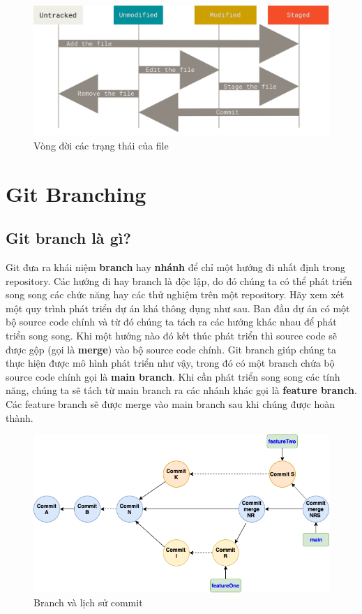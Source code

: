 \documentclass[a4paper, 11pt]{article}
\begin{document}
\begin{figure}
\centering
\includegraphics[width=12cm]{lifecycle.png}
\caption{Vòng đời các trạng thái của file}
\label{fig:file-status-lifecycle}
\end{figure}

\clearpage
\section{Git Branching}
\subsection{Git branch là gì?}
Git đưa ra khái niệm \textbf{branch} hay \textbf{nhánh} để chỉ một hướng đi nhất định trong repository. Các hướng đi hay branch là độc lập, do đó chúng ta có thể phát triển song song các chức năng hay các thử nghiệm trên một repository. Hãy xem xét một quy trình phát triển dự án khá thông dụng như sau. Ban đầu dự án có một bộ source code chính và từ đó chúng ta tách ra các hướng khác nhau để phát triển song song. Khi một hướng nào đó kết thúc phát triển thì source code sẽ được gộp (gọi là \textbf{merge}) vào bộ source code chính. Git branch giúp chúng ta thực hiện được mô hình phát triển như vậy, trong đó có một branch chứa bộ source code chính gọi là \textbf{main branch}. Khi cần phát triển song song các tính năng, chúng ta sẽ tách từ main branch ra các nhánh khác gọi là \textbf{feature branch}. Các feature branch sẽ được merge vào main branch sau khi chúng được hoàn thành. 

\begin{figure}
\centering
\includegraphics[width=12cm]{git-branch.png}
\caption{Branch và lịch sử commit}
\label{fig:git-branch}
\end{figure}
\end{document}
